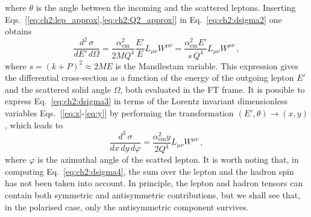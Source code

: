 where $\theta$ is the angle between the incoming and the scattered leptons. Inserting Eqs.~[\ref{eq:ch2:lep_approx},\ref{eq:ch2:Q2_approx}] in Eq.~\eqref{eq:ch2:dsigma2} one obtains 
\begin{equation}
    \frac{d^2\,\sigma}{dE' \, d\Omega} = \frac{\alpha_{\textrm{em}}^2}{2MQ^4} \frac{E'}{E} L_{\mu\nu}W^{\mu\nu} = \frac{\alpha_{\textrm{em}}^2 E'}{s\, Q^4} L_{\mu\nu}W^{\mu\nu}\,,
    \label{eq:ch2:dsigma3}
\end{equation}
where $s = (k + P)^2 \approx 2 M E$ is the Mandlestam variable. This expression gives the differential cross-section as a function of the energy of the outgoing lepton $E'$ and the scattered solid angle $\Omega$, both evaluated in the FT frame. It is possible to express Eq.~\eqref{eq:ch2:dsigma3} in terms of the Lorentz invariant dimensionless variables Eqs.~[\ref{eq:x}-\ref{eq:y}] by performing the transformation $(E', \theta) \rightarrow (x,y)$, which leads to
\begin{equation}
    \frac{d^3 \, \sigma}{dx \, dy \, d\varphi} = \frac{\alpha_{\textrm{em}}^2 y}{2 Q^4} L_{\mu\nu} W^{\mu\nu} \,,
    \label{eq:ch2:dsigma4}
\end{equation}
where $\varphi$ is the azimuthal angle of the scatted lepton. It is worth noting that, in computing Eq.~\eqref{eq:ch2:dsigma4}, the sum over the lepton and the hadron spin has not been taken into account. In principle, the lepton and hadron tensors can contain both symmetric and antisymmetric contributions, but we shall see that, in the polarised case, only the antisymmetric component survives.

